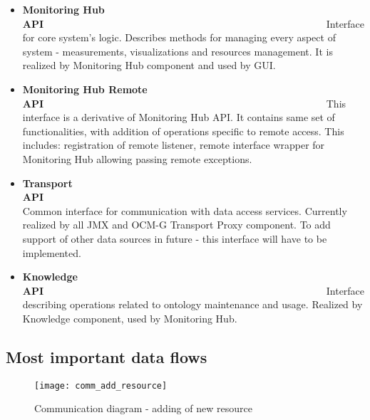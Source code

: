 \begin{itemize}
 \item {\bf Monitoring Hub API}~~~~~~~~~~~~~~~~~~~~~~~~~~~~~~~~~~~~~~~~~~~~~~~~~~~~~~~~\linebreak
Interface for core system's logic. Describes methods for managing every aspect of system - measurements, visualizations
and resources management. It is realized by Monitoring Hub component and used by GUI. 

 \item {\bf Monitoring Hub Remote API}~~~~~~~~~~~~~~~~~~~~~~~~~~~~~~~~~~~~~~~~~~~~~~~~~~~~~~~~\linebreak
This interface is a derivative of Monitoring Hub API. It contains same set of functionalities, with addition
of operations specific to remote access. This includes: registration of remote listener, remote
interface wrapper for Monitoring Hub allowing passing remote exceptions.

 \item {\bf Transport API}~~~~~~~~~~~~~~~~~~~~~~~~~~~~~~~~~~~~~~~~~~~~~~~~~~~~~~~~\linebreak
Common interface for communication with data access services. Currently realized by all JMX and OCM-G Transport Proxy
component. To add support of other data sources in future - this interface will have to be implemented.

 \item {\bf Knowledge API}~~~~~~~~~~~~~~~~~~~~~~~~~~~~~~~~~~~~~~~~~~~~~~~~~~~~~~~~\linebreak
Interface describing operations related to ontology maintenance and usage. Realized by Knowledge component, used
by Monitoring Hub. 
\end{itemize}



\subsection{Most important data flows}

\begin{figure}[h]
  \centering
  \texttt{[image: comm\_add\_resource]}
  \caption{Communication diagram - adding of new resource}
  \label{fig:comm_add_resource}
\end{figure}

